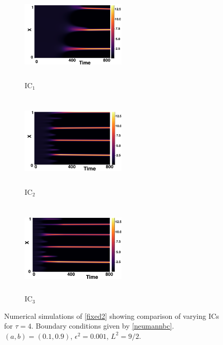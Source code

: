 \begin{figure}[H]
    \centering
    \begin{subfigure}[b]{0.32\textwidth}
        \centering
        \includegraphics[width=5cm,height=4.5cm]{gaff4.png}
        \caption{$\text{IC}_1$}
        \label{}
    \end{subfigure}
    \hfill
    \begin{subfigure}[b]{0.32\textwidth}
        \centering
        \includegraphics[width=5cm,height=4.5cm]{ic24.png}
        \caption{$\text{IC}_2$}
        \label{}
    \end{subfigure}
    \hfill
    \begin{subfigure}[b]{0.32\textwidth}
        \centering
        \includegraphics[width=5cm,height=4.5cm]{ic34.png}
        \caption{$\text{IC}_3$}
        \label{}
    \end{subfigure}
    \caption{Numerical simulations of \eqref{fixed2} showing comparison of varying ICs for $\tau=4$. Boundary conditions given by \eqref{neumannbc}. $(a,b)=(0.1,0.9)$, $\epsilon^2=0.001$, $L^2=9/2$.}
    \label{fig:figtau4}
\end{figure}
